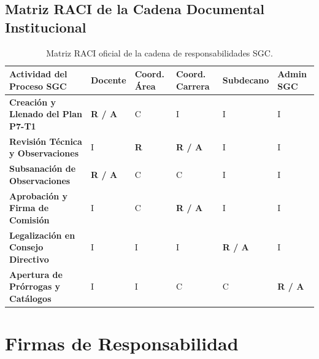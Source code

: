 \documentclass[12pt,a4paper]{article}
\begin{document}
\subsection{Matriz RACI de la Cadena Documental Institucional}
\begin{table}[H]
\centering
\small
\renewcommand{\arraystretch}{1.2}
\begin{tabularx}{\textwidth}{|>{\hsize=1.5\hsize\raggedright\arraybackslash\bfseries\footnotesize}X|>{\hsize=0.9\hsize\centering\arraybackslash\footnotesize}X|>{\hsize=0.9\hsize\centering\arraybackslash\footnotesize}X|>{\hsize=0.9\hsize\centering\arraybackslash\footnotesize}X|>{\hsize=0.9\hsize\centering\arraybackslash\footnotesize}X|>{\hsize=0.9\hsize\centering\arraybackslash\footnotesize}X|}
\hline
\rowcolor{tableheader}
\textbf{Actividad del Proceso SGC} & \textbf{Docente} & \textbf{Coord. Área} & \textbf{Coord. Carrera} & \textbf{Subdecano} & \textbf{Admin SGC} \\
\hline
Creación y Llenado del Plan P7-T1 & \textbf{R / A} & C & I & I & I \\
\hline
Revisión Técnica y Observaciones & I & \textbf{R} & \textbf{R / A} & I & I \\
\hline
Subsanación de Observaciones & \textbf{R / A} & C & C & I & I \\
\hline
Aprobación y Firma de Comisión & I & C & \textbf{R / A} & I & I \\
\hline
Legalización en Consejo Directivo & I & I & I & \textbf{R / A} & I \\
\hline
Apertura de Prórrogas y Catálogos & I & I & C & C & \textbf{R / A} \\
\hline
\end{tabularx}
\caption{Matriz RACI oficial de la cadena de responsabilidades SGC.}
\label{tab:matriz_raci}
\end{table}

\section{Firmas de Responsabilidad}
\end{document}
